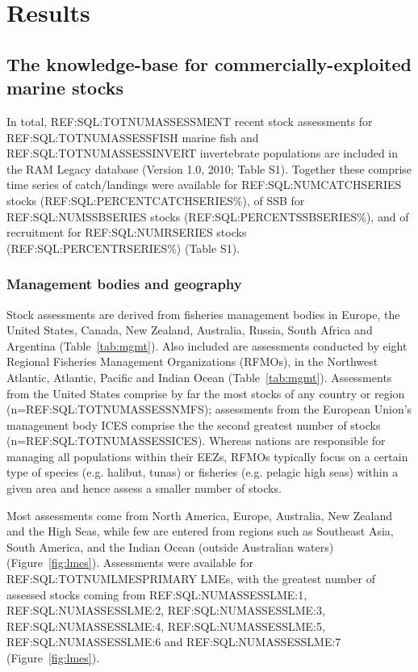 \newpage
\section*{Results}
\subsection*{The knowledge-base for commercially-exploited marine stocks}
In total, REF:SQL:TOTNUMASSESSMENT recent stock assessments for
REF:SQL:TOTNUMASSESSFISH marine fish and REF:SQL:TOTNUMASSESSINVERT
invertebrate populations are included in the RAM Legacy database
(Version 1.0, 2010; Table S1). Together these comprise time series of
catch/landings were available for REF:SQL:NUMCATCHSERIES stocks (REF:SQL:PERCENTCATCHSERIES\%),
of SSB for REF:SQL:NUMSSBSERIES stocks (REF:SQL:PERCENTSSBSERIES\%), and of recruitment for
REF:SQL:NUMRSERIES stocks (REF:SQL:PERCENTRSERIES\%) (Table S1).

\subsubsection*{Management bodies and geography}
Stock assessments are derived from fisheries management bodies
in Europe, the United States, Canada, New Zealand, Australia, Russia,
South Africa and Argentina (Table~\ref{tab:mgmt}). Also included are assessments
conducted by eight Regional Fisheries Management Organizations
(RFMOs), in the Northwest Atlantic, Atlantic, Pacific and Indian Ocean
(Table~\ref{tab:mgmt}). Assessments from the United States comprise by far the most
stocks of any country or region (n=REF:SQL:TOTNUMASSESSNMFS);
assessments from the European Union's management body ICES comprise
the the second greatest number of stocks (n=REF:SQL:TOTNUMASSESSICES).
Whereas nations are responsible for managing all populations within
their EEZs, RFMOs typically focus on a certain type of species (e.g.
halibut, tunas) or fisheries (e.g. pelagic high seas) within a given
area and hence assess a smaller number of stocks.

Most assessments come from North America, Europe, Australia, New
Zealand and the High Seas, while few are entered from regions such as
Southeast Asia, South America, and the Indian Ocean (outside
Australian waters) (Figure~\ref{fig:lmes}). Assessments were available for REF:SQL:TOTNUMLMESPRIMARY LMEs, with the greatest number of
assessed stocks coming from REF:SQL:NUMASSESSLME:1,
REF:SQL:NUMASSESSLME:2, REF:SQL:NUMASSESSLME:3,
REF:SQL:NUMASSESSLME:4, REF:SQL:NUMASSESSLME:5, REF:SQL:NUMASSESSLME:6
and REF:SQL:NUMASSESSLME:7 (Figure~\ref{fig:lmes}).


